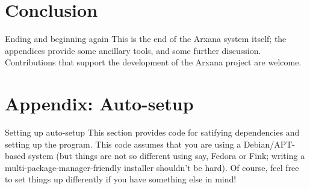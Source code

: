\section{Conclusion} \label{conclusion}

\begin{notate}{Ending and beginning again}
This is the end of the Arxana system itself; the
appendices provide some ancillary tools, and some further
discussion.  Contributions that support the development of
the Arxana project are welcome.
\end{notate}

\appendix

\section{Appendix: Auto-setup} \label{appendix-setup}

\begin{notate}{Setting up auto-setup}
This section provides code for satifying dependencies and
setting up the program.  This code assumes that you are
using a Debian/APT-based system (but things are not so
different using say, Fedora or Fink; writing a
multi-package-manager-friendly installer shouldn't be
hard).  Of course, feel free to set things up differently
if you have something else in mind!
\end{notate}

